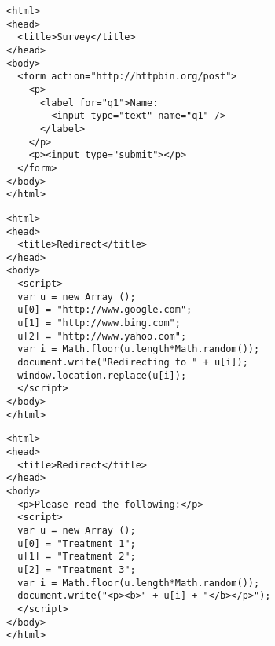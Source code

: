 \begin{frame}[fragile]
\small
\begin{verbatim}
<html>
<head>
  <title>Survey</title>
</head>
<body>
  <form action="http://httpbin.org/post">
    <p>
      <label for="q1">Name: 
        <input type="text" name="q1" />
      </label>
    </p>
    <p><input type="submit"></p>
  </form>
</body>
</html>
\end{verbatim}
\end{frame}




\begin{frame}[fragile]
\small
\begin{verbatim}
<html>
<head>
  <title>Redirect</title>
</head>
<body>
  <script>
  var u = new Array ();
  u[0] = "http://www.google.com";
  u[1] = "http://www.bing.com";
  u[2] = "http://www.yahoo.com";
  var i = Math.floor(u.length*Math.random());
  document.write("Redirecting to " + u[i]);
  window.location.replace(u[i]);
  </script>
</body>
</html>
\end{verbatim}
\end{frame}



\begin{frame}[fragile]
\small
\begin{verbatim}
<html>
<head>
  <title>Redirect</title>
</head>
<body>
  <p>Please read the following:</p>
  <script>
  var u = new Array ();
  u[0] = "Treatment 1";
  u[1] = "Treatment 2";
  u[2] = "Treatment 3";
  var i = Math.floor(u.length*Math.random());
  document.write("<p><b>" + u[i] + "</b></p>");
  </script>
</body>
</html>
\end{verbatim}
\end{frame}


